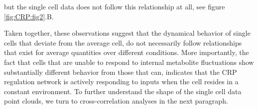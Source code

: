 but the single cell data does not follow this relationship at all, see figure \ref{fig:CRP:fig2}.B. 
%
%

Taken together, these observations suggest that the dynamical behavior of single cells that deviate from the average cell, do not necessarily follow relationships that exist for average quantities over different conditions. More importantly, the fact that cells that are unable to respond to internal metabolite fluctuations show substantially different behavior from those that can, indicates that the CRP regulation network is actively responding to inputs when the cell resides in a constant environment.
%
To further understand the shape of the single cell data point clouds, we turn to cross-correlation analyses in the next paragraph.



